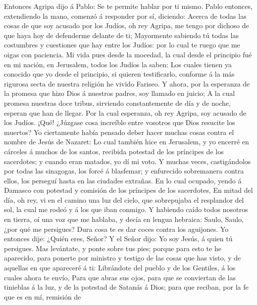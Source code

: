 Entonces Agripa dijo á Pablo: Se te permite hablar por ti
mismo. Pablo entonces, extendiendo la mano, comenzó á responder por sí,
diciendo:  Acerca de todas las cosas de que soy acusado
por los Judíos, oh rey Agripa, me tengo por dichoso de que haya hoy de
defenderme delante de ti;  Mayormente sabiendo tú todas
las costumbres y cuestiones que hay entre los Judíos: por lo cual te
ruego que me oigas con paciencia.  Mi vida pues desde la
mocedad, la cual desde el principio fué en mi nación, en Jerusalem,
todos los Judíos la saben:  Los cuales tienen ya conocido
que yo desde el principio, si quieren testificarlo, conforme á la más
rigurosa secta de nuestra religión he vivido Fariseo.  Y
ahora, por la esperanza de la promesa que hizo Dios á nuestros padres,
soy llamado en juicio;  A la cual promesa nuestras doce
tribus, sirviendo constantemente de día y de noche, esperan que han de
llegar. Por la cual esperanza, oh rey Agripa, soy acusado de los Judíos.
 ¡Qué! ¿Júzgase cosa increíble entre vosotros que Dios
resucite los muertos?  Yo ciertamente había pensado deber
hacer muchas cosas contra el nombre de Jesús de Nazaret: 
Lo cual también hice en Jerusalem, y yo encerré en cárceles á muchos de
los santos, recibida potestad de los príncipes de los sacerdotes; y
cuando eran matados, yo dí mi voto.  Y muchas veces,
castigándolos por todas las sinagogas, los forcé á blasfemar; y
enfurecido sobremanera contra ellos, los perseguí hasta en las ciudades
extrañas.  En lo cual ocupado, yendo á Damasco con
potestad y comisión de los príncipes de los sacerdotes, 
En mitad del día, oh rey, vi en el camino una luz del cielo, que
sobrepujaba el resplandor del sol, la cual me rodeó y á los que iban
conmigo.  Y habiendo caído todos nosotros en tierra, oí
una voz que me hablaba, y decía en lengua hebraica: Saulo, Saulo, ¿por
qué me persigues? Dura cosa te es dar coces contra los aguijones.
 Yo entonces dije: ¿Quién eres, Señor? Y el Señor dijo:
Yo soy Jesús, á quien tú persigues.  Mas levántate, y
ponte sobre tus pies; porque para esto te he aparecido, para ponerte por
ministro y testigo de las cosas que has visto, y de aquellas en que
apareceré á ti:  Librándote del pueblo y de los Gentiles,
á los cuales ahora te envío,  Para que abras sus ojos,
para que se conviertan de las tinieblas á la luz, y de la potestad de
Satanás á Dios; para que reciban, por la fe que es en mí, remisión de
